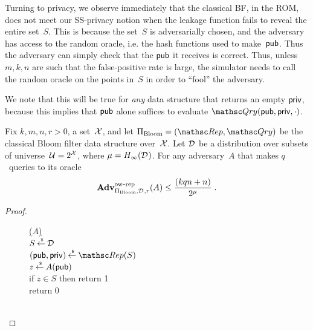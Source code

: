 Turning to privacy, we observe immediately that the classical BF, in the
ROM, does not meet our SS-privacy notion when the leakage function
fails to reveal the entire set~$S$.  This is because the set~$S$ is
adversarially chosen, and the adversary has access to the random
oracle, i.e. the hash functions used to make~${\sf pub}$.  Thus the
adversary can simply check that the ${\sf pub}$ it receives is correct.
Thus, unless $m,k,n$ are such that the false-positive rate is large,
the simulator needs to call the random oracle on the points in~$S$ in order to ``fool'' the adversary.

We note that this will be true for \emph{any} data structure that returns an empty ${\sf priv}$, because this implies that ${\sf pub}$ alone suffices to evaluate $\Qry(\pubaux,\privaux,\cdot)$.

\begin{theorem}\label{thm3}\label{thm:bf-ow}
Fix $k,m,n,r>0$, a set~${\cal X}$, and let $\setprim_{\mathrm{Bloom}}= (\Rep, \Qry)$ be the classical Bloom filter data structure over~${\cal X}$. Let $\mathcal{D}_{}^{}$ be a distribution over subsets of universe~${\cal U}=2^{\cal X}$, where $\mu = H_\infty(\mathcal{D}_{}^{})$.  For any adversary~$A$ that makes $q$~queries to its oracle
\[
\mathrm{\mathbf{Adv}}^{\mathrm{ow\mbox{-}rep}}_{\Pi_{\mathrm{Bloom}},\mathcal{D}_{}^{},r}(A) \leq  \frac{(kqn+n)}{2^{\mu}}\;.
\]
\end{theorem}
\begin{proof}
\begin{figure}[tp]
{\underline{($A$)}\\
$S {\:\stackrel{{\scriptscriptstyle \hspace{0.2em}\$}} {\leftarrow}\:} \mathcal{D}_{}^{}$\\
$(\pubaux,\privaux) \getsr \Rep(S)$\\
$z {\:\stackrel{{\scriptscriptstyle \hspace{0.2em}\$}} {\leftarrow}\:} A({\sf pub})$\\
if $z \in S$ then return 1\\
return 0\\

\medskip
{}\\
}
{
}
\end{figure}
\end{proof}


